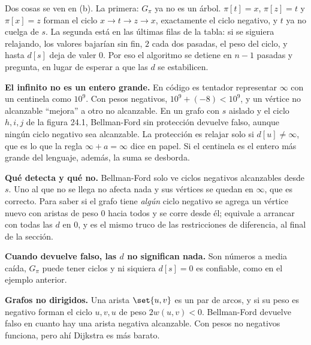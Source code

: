 \documentclass[11pt,letterpaper]{article}
\begin{document}
\begin{ejemplo}
\begin{center}
  \end{center}
  Dos cosas se ven en (b). La primera: $G_\pi$ ya no es un árbol.
  $\pi[t] = x$, $\pi[z] = t$ y $\pi[x] = z$ forman el ciclo
  $x \to t \to z \to x$, exactamente el ciclo negativo, y $t$ ya no
  cuelga de $s$. La segunda está en las últimas filas de la tabla: si
  se siguiera relajando, los valores bajarían sin fin, $2$ cada dos
  pasadas, el peso del ciclo, y hasta $d[s]$ deja de valer $0$. Por
  eso el algoritmo se detiene en $n - 1$ pasadas y pregunta, en lugar
  de esperar a que las $d$ se estabilicen.
\end{ejemplo}

\begin{ojo}
  \textbf{El infinito no es un entero grande.} En código es tentador
  representar $\infty$ con un centinela como $10^9$. Con pesos
  negativos, $10^9 + (-8) < 10^9$, y un vértice no alcanzable
  ``mejora'' a otro no alcanzable. En un grafo con $s$ aislado y el
  ciclo $h, i, j$ de la figura 24.1, Bellman-Ford sin protección
  devuelve falso, aunque ningún ciclo negativo sea alcanzable. La
  protección es relajar solo si $d[u] \neq \infty$, que es lo que la
  regla $\infty + a = \infty$ dice en papel. Si el centinela es el
  entero más grande del lenguaje, además, la suma se desborda.
\end{ojo}

\begin{ojo}
  \textbf{Qué detecta y qué no.} Bellman-Ford solo ve ciclos
  negativos alcanzables desde $s$. Uno al que no se llega no afecta
  nada y sus vértices se quedan en $\infty$, que es correcto. Para
  saber si el grafo tiene \emph{algún} ciclo negativo se agrega un
  vértice nuevo con aristas de peso $0$ hacia todos y se corre desde
  él; equivale a arrancar con todas las $d$ en $0$, y es el mismo
  truco de las restricciones de diferencia, al final de la sección.

  \smallskip
  \textbf{Cuando devuelve falso, las $d$ no significan nada.} Son
  números a media caída, $G_\pi$ puede tener ciclos y ni siquiera
  $d[s] = 0$ es confiable, como en el ejemplo anterior.

  \smallskip
  \textbf{Grafos no dirigidos.} Una arista $\set{u, v}$ es un par de
  arcos, y si su peso es negativo forman el ciclo $u, v, u$ de peso
  $2w(u, v) < 0$. Bellman-Ford devuelve falso en cuanto hay una
  arista negativa alcanzable. Con pesos no negativos funciona, pero
  ahí Dijkstra es más barato.
\end{ojo}
\end{document}

